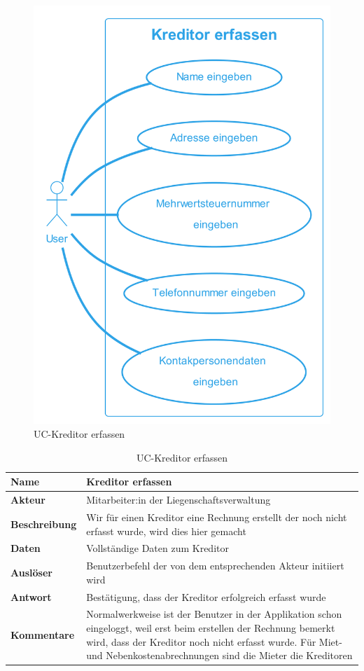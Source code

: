 \newpage
\begin{figure}[H]
  \begin{center}
    \includegraphics[width=0.5\linewidth]{content/diagrams/out/usecase/kreditorErfassen/Kreditor erfassen.png}
    \caption{UC-Kreditor erfassen}
    \label{kreditorErfassen}
  \end{center}
\end{figure}

\begin{table}[H]
  \centering
  \settowidth{}
  \setlength\extrarowheight{2pt}
  \begin{tabulary}{1.0\textwidth}{|a|m{14cm}|}
    \hline
    \textbf{Name}& Kreditor erfassen\\
    \hline
    \textbf{Akteur}& Mitarbeiter:in der Liegenschaftsverwaltung\\
    \hline 
    \textbf{Beschreibung} & Wir für einen Kreditor eine Rechnung erstellt der noch nicht erfasst wurde, wird dies hier gemacht\\
    \hline
    \textbf{Daten} & Vollständige Daten zum Kreditor\\
    \hline
    \textbf{Auslöser} & Benutzerbefehl der von dem entsprechenden Akteur initiiert wird\\
    \hline
    \textbf{Antwort} & Bestätigung, dass der Kreditor erfolgreich erfasst wurde\\
    \hline
    \textbf{Kommentare} & Normalwerkweise ist der Benutzer in der Applikation schon eingeloggt, weil erst beim erstellen der Rechnung bemerkt wird, dass der Kreditor noch nicht erfasst wurde. Für Miet-und Nebenkostenabrechnungen sind die Mieter die Kreditoren \\
    \hline
  \end{tabulary}
  \caption{UC-Kreditor erfassen}
\end{table}
